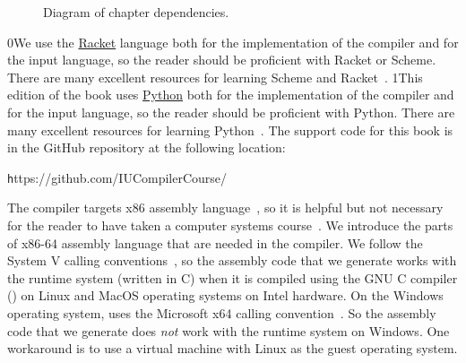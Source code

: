 \documentclass[7x10]{TimesAPriori_MIT}%
\def\racketEd{0}
\def\pythonEd{1}
\providecommand{\BookEdition}{1}
\let\edition\BookEdition
\newcommand{\racket}[1]{{\if\edition\racketEd{#1}\fi}}
\newcommand{\pythonColor}[0]{}
\newcommand{\python}[1]{{\if\edition\pythonEd\pythonColor #1\fi}}
\numberwithin{theorem}{chapter}
\numberwithin{definition}{chapter}
\numberwithin{equation}{chapter}
\begin{document}
\begin{figure}[tp]
\begin{tcolorbox}[colback=white]
{
\fi}
\end{tcolorbox}
\caption{Diagram of chapter dependencies.}
\label{fig:chapter-dependences}
\end{figure}

\racket{We use the \href{https://racket-lang.org/}{Racket} language both for
the implementation of the compiler and for the input language, so the
reader should be proficient with Racket or Scheme. There are many
excellent resources for learning Scheme and
Racket~\citep{Dybvig:1987aa,Abelson:1996uq,Friedman:1996aa,Felleisen:2001aa,Felleisen:2013aa,Flatt:2014aa}.}
%
\python{This edition of the book uses \href{https://www.python.org/}{Python}
both for the implementation of the compiler and for the input language, so the
reader should be proficient with Python. There are many
excellent resources for learning Python~\citep{Lutz:2013vp,Barry:2016vj,Sweigart:2019vn,Matthes:2019vs}.}%
%
The support code for this book is in the GitHub repository at
the following location:
\begin{center}\small\texttt
  https://github.com/IUCompilerCourse/
\end{center}

The compiler targets x86 assembly language~\citep{Intel:2015aa}, so it
is helpful but not necessary for the reader to have taken a computer
systems course~\citep{Bryant:2010aa}. We introduce the parts of x86-64
assembly language that are needed in the compiler.
%
We follow the System V calling
conventions~\citep{Bryant:2005aa,Matz:2013aa}, so the assembly code
that we generate works with the runtime system (written in C) when it
is compiled using the GNU C compiler () on Linux and MacOS
operating systems on Intel hardware.
%
On the Windows operating system,  uses the Microsoft x64
calling convention~\citep{Microsoft:2018aa,Microsoft:2020aa}. So the
assembly code that we generate does \emph{not} work with the runtime
system on Windows. One workaround is to use a virtual machine with
Linux as the guest operating system.
\end{document}
